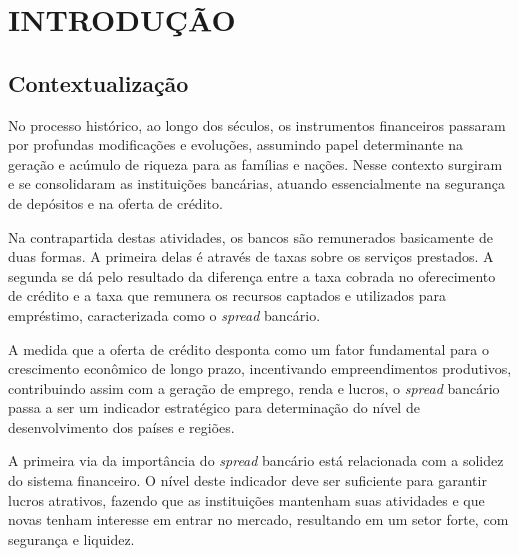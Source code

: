 \documentclass[12pt,openright,oneside,a4paper,chapter=TITLE,section=TITLE,subsection=TITLE,english,french,spanish,portugues,sumario=tradicional]{abntex2}
\begin{document}




\textual
\pagestyle{simple}

\parindent 1.50cm

\chapter[introducao]{INTRODUÇÃO}

\section{Contextualização}

No processo histórico, ao longo dos séculos, os instrumentos financeiros
passaram por profundas modificações e evoluções, assumindo papel determinante
na geração e acúmulo de riqueza para as famílias e nações. Nesse contexto
surgiram e se consolidaram as instituições bancárias, atuando essencialmente na
segurança de depósitos e na oferta de crédito.

Na contrapartida destas atividades, os bancos são remunerados basicamente de
duas formas. A primeira delas é através de taxas sobre os serviços prestados. A
segunda se dá pelo resultado da diferença entre a taxa cobrada no oferecimento
de crédito e a taxa que remunera os recursos captados e utilizados para
empréstimo, caracterizada como o \emph{spread} bancário.

A medida que a oferta de crédito desponta como um fator fundamental para o
crescimento econômico de longo prazo, incentivando empreendimentos produtivos,
contribuindo assim com a geração de emprego, renda e lucros, o \emph{spread} bancário passa a ser um indicador estratégico para determinação do nível de desenvolvimento dos países e regiões.

A primeira via da importância do \emph{spread} bancário está relacionada com a
solidez do sistema financeiro. O nível deste indicador deve ser suficiente para
garantir lucros atrativos, fazendo que as instituições mantenham suas
atividades e que novas tenham interesse em entrar no mercado, resultando em um
setor forte, com segurança e liquidez.
\end{document}
